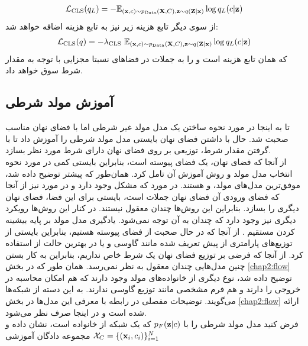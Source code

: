 \begin{align}
    {\mathcal{L}}_\text{CLS} (q_L) = -\mathbb E_{({\bf x}, c) \sim p_\text{Data}({\bf X},C) , {\bf z} \sim q({\bf Z}|{\bf x})} \log q_L(c | {\bf z})
\end{align}
از سوی دیگر تابع هزینه زیر نیز به تابع هزینه \encoder{} اضافه خواهد شد:
\begin{align}
{\mathcal{L}}_\text{CLS} (q) = - \lambda_\text{CLS} ~ \mathbb E_{({\bf x}, c) \sim p_\text{Data}({\bf X},C) , {\bf z} \sim q({\bf Z}|{\bf x})} \log q_L(c | {\bf z})
\end{align}
که همان تابع هزینه \classifier{} است و \encoder{} را به \encode{} جملات در فضاهای نسبتا مجزایی با توجه به مقدار شرط سوق خواهد داد.

\subsection{آموزش مولد شرطی}
تا به اینجا در مورد نحوه ساختن یک مدل مولد غیر شرطی اما با فضای نهان مناسب صحبت شد. حال با داشتن فضای نهان بایستی مدل مولد شرطی را آموزش داد تا با گرفتن مقدار شرط، توزیعی بر روی فضای نهان دارای شرط مورد نظر بسازد.
\\
از آنجا که فضای نهان، یک فضای پیوسته است، بنابراین بایستی کمی در مورد نحوه انتخاب مدل مولد و روش آموزش آن تامل کرد. همان‌طور که پیشتر توضیح داده شد، موفق‌ترین مدل‌های مولد، \gan{} و \vae{} هستند. در مورد \gan{} که مشکل \modecollapse{} وجود دارد و در مورد \vae{} نیز از آنجا که فضای ورودی آن فضای نهان جملات است، بایستی برای این فضا، فضای نهان دیگری را بسازد. بنابراین این روش‌ها چندان معقول نیستند. در کنار این روش‌ها رویکرد دیگری نیز وجود دارد که چندان به آن توجه نمی‌شود. یادگیری مدل مولد بر پایه بیشینه کردن مستقیم \likelihood{}. از آنجا که در حال صحبت از فضای پیوسته هستیم، بنابراین بایستی از توزیع‌های پارامتری از پیش تعریف شده مانند گاوسی و یا در بهترین حالت از
استفاده کرد. از آنجا که فرضی بر توزیع فضای نهان یک شرط خاص نداریم، بنابراین به کار بستن چنین مدل‌هایی چندان معقول به نظر نمی‌رسد. همان طور که در بخش \ref{chap2:flow}‌ توضیح داده شد، نوع دیگری از خانواده‌های مولد وجود دارند که هم امکان محاسبه \likelihood{} در خروجی را دارند و هم فرم مشخصی مانند توزیع گاوسی ندارند. به این دسته از شبکه‌ها \normalizingflownets{} می‌گویند. توضیحات مفصلی در رابطه با معرفی این مدل‌ها در بخش \ref{chap2:flow} ارائه شده است و در اینجا صرف نظر می‌شود.
\\
فرض کنید مدل مولد شرطی را با $p_F({\bf z}|c)$ که یک شبکه از خانواده \normalizingflownets{} است، نشان داده و مجموعه دادگان آموزشی
$\mathcal{X}_C = \{({\bf x}_i, c_i)\}_{i=1}^{N}$
